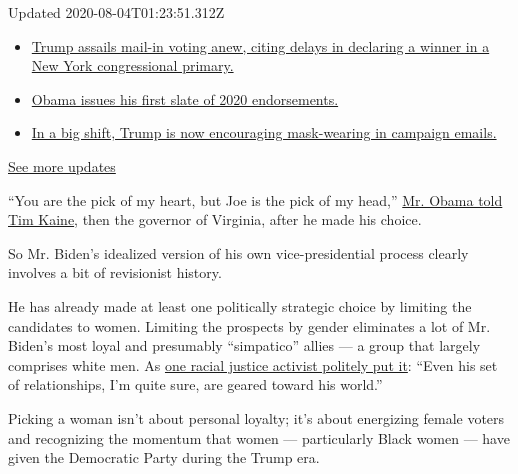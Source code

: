Updated 2020-08-04T01:23:51.312Z

\begin{itemize}
\tightlist
\item
  \href{https://www.nytimes.com/2020/08/03/us/elections/biden-vs-trump.html?action=click\&pgtype=Article\&state=default\&region=MAIN_CONTENT_1\&context=storylines_live_updates\#link-6494b448}{Trump
  assails mail-in voting anew, citing delays in declaring a winner in a
  New York congressional primary.}
\item
  \href{https://www.nytimes.com/2020/08/03/us/elections/biden-vs-trump.html?action=click\&pgtype=Article\&state=default\&region=MAIN_CONTENT_1\&context=storylines_live_updates\#link-3de249e6}{Obama
  issues his first slate of 2020 endorsements.}
\item
  \href{https://www.nytimes.com/2020/08/03/us/elections/biden-vs-trump.html?action=click\&pgtype=Article\&state=default\&region=MAIN_CONTENT_1\&context=storylines_live_updates\#link-54e34d20}{In
  a big shift, Trump is now encouraging mask-wearing in campaign
  emails.}
\end{itemize}

\href{https://www.nytimes.com/2020/08/03/us/elections/biden-vs-trump.html?action=click\&pgtype=Article\&state=default\&region=MAIN_CONTENT_1\&context=storylines_live_updates}{See
more updates}

``You are the pick of my heart, but Joe is the pick of my head,''
\href{https://www.nytimes.com/2019/08/16/us/politics/biden-obama-history.html}{Mr.
Obama told Tim Kaine}, then the governor of Virginia, after he made his
choice.

So Mr. Biden's idealized version of his own vice-presidential process
clearly involves a bit of revisionist history.

He has already made at least one politically strategic choice by
limiting the candidates to women. Limiting the prospects by gender
eliminates a lot of Mr. Biden's most loyal and presumably ``simpatico''
allies --- a group that largely comprises white men. As
\href{https://www.washingtonpost.com/politics/biden-under-pressure-to-shatter-cement-ceiling-by-naming-a-black-woman-to-be-his-running-mate/2020/07/19/7dfb9dcc-c06f-11ea-9fdd-b7ac6b051dc8_story.html}{one
racial justice activist politely put it}: ``Even his set of
relationships, I'm quite sure, are geared toward his world.''

Picking a woman isn't about personal loyalty; it's about energizing
female voters and recognizing the momentum that women --- particularly
Black women --- have given the Democratic Party during the Trump era.

